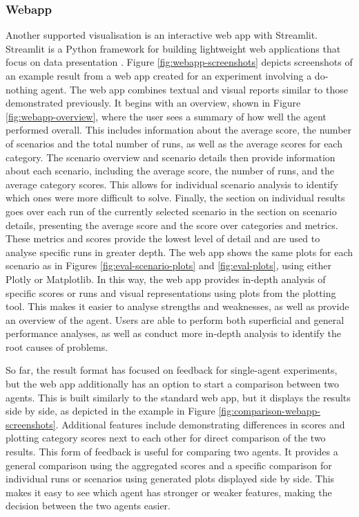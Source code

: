 \subsubsection{Webapp}
Another supported visualisation is an interactive web app with Streamlit. Streamlit is a Python framework for building lightweight web applications that focus on data presentation \cite{streamlit}. Figure \ref{fig:webapp-screenshots} depicts screenshots of an example result from a web app created for an experiment involving a do-nothing agent. The web app combines textual and visual reports similar to those demonstrated previously. It begins with an overview, shown in Figure \ref{fig:webapp-overview}, where the user sees a summary of how well the agent performed overall. This includes information about the average score, the number of scenarios and the total number of runs, as well as the average scores for each category. The scenario overview and scenario details then provide information about each scenario, including the average score, the number of runs, and the average category scores. This allows for individual scenario analysis to identify which ones were more difficult to solve. 
Finally, the section on individual results goes over each run of the currently selected scenario in the section on scenario details, presenting the average score and the score over categories and metrics. These metrics and scores provide the lowest level of detail and are used to analyse specific runs in greater depth. The web app shows the same plots for each scenario as in Figures \ref{fig:eval-scenario-plots} and \ref{fig:eval-plots}, using either Plotly or Matplotlib. In this way, the web app provides in-depth analysis of specific scores or runs and visual representations using plots from the plotting tool. This makes it easier to analyse strengths and weaknesses, as well as provide an overview of the agent. Users are able to perform both superficial and general performance analyses, as well as conduct more in-depth analysis to identify the root causes of problems. 

So far, the result format has focused on feedback for single-agent experiments, but the web app additionally has an option to start a comparison between two agents. This is built similarly to the standard web app, but it displays the results side by side, as depicted in the example in Figure \ref{fig:comparison-webapp-screenshots}. Additional features include demonstrating differences in scores and plotting category scores next to each other for direct comparison of the two results. This form of feedback is useful for comparing two agents. It provides a general comparison using the aggregated scores and a specific comparison for individual runs or scenarios using generated plots displayed side by side. This makes it easy to see which agent has stronger or weaker features, making the decision between the two agents easier.


